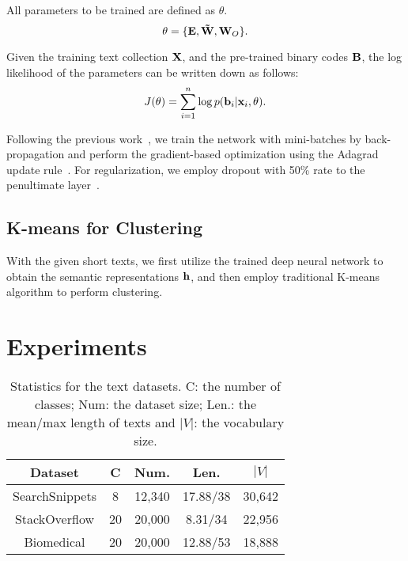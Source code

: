 \documentclass[review]{elsarticle}
\begin{document}
All parameters to be trained are defined as \(\theta \).
\begin{equation}
\theta  = \{ {\bf{E}},{\bf{\tilde W}},{{\bf{W}}_O}\}.
\label{eq:theta}
\end{equation}

Given the training text collection \({\bf{X}}\), and the pre-trained binary codes \({\bf{B}}\), the log likelihood of the parameters can be written down as follows:
\begin{equation}
{J({\bf{\theta }})} = \sum\limits_{i = 1}^n {\log p({{\bf{b}}_i}|{{\bf{x}}_i},{\bf{\theta }})}.
\label{eq:likelihood}
\end{equation}

Following the previous work~\cite{16_blunsom2014convolutional}, we train the network with mini-batches by back-propagation and perform the gradient-based optimization using the Adagrad update rule~\cite{36_duchi2011adaptive}. For regularization, we employ dropout with 50\% rate to the penultimate layer~\cite{16_blunsom2014convolutional,22_kim2014convolutional}.

\subsection{K-means for Clustering}
With the given short texts, we first utilize the trained deep neural network to obtain the semantic representations \({\bf{h}}\), and then employ traditional K-means algorithm to perform clustering.

\section{Experiments}
\label{sec:Experiments}

\begin{table}[t] \begin{center}
\begin{tabular}{|c|c|c|c|c|}\hline
Dataset&C &Num. &Len. &$|V|$\\\hline \hline
SearchSnippets   &	8    &	12,340     &	17.88/38  &	30,642       \\
StackOverflow     &	20    &	20,000     &	8.31/34  &	22,956       \\
Biomedical     &	20    &	20,000     &	 12.88/53 &	18,888       \\\hline
\end{tabular}
\end{center}
\caption{\label{tb:Datasets} Statistics for the text datasets. C: the number of classes; Num: the dataset size; Len.: the mean/max length of texts and $|V|$: the vocabulary size.}
\end{table}
\end{document}
